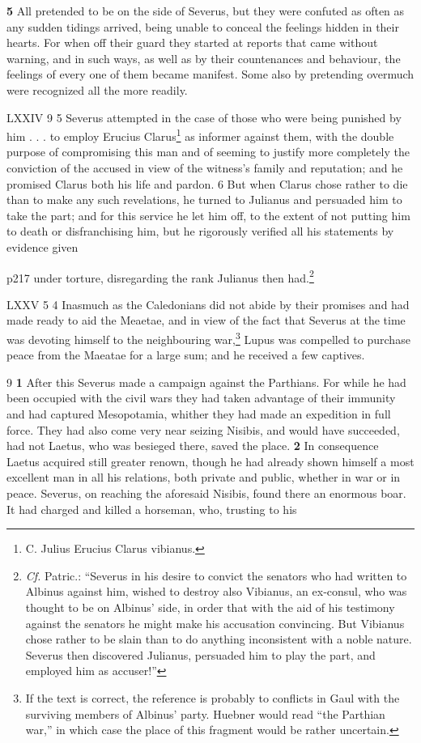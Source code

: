 \textbf{5} All pretended to be on the side of Severus, but they were confuted as often as any sudden tidings arrived, being unable to conceal the feelings hidden in their hearts. For when off their guard they started at reports that came without warning, and in such ways, as well as by their countenances and behaviour, the feelings of every one of them became manifest. Some also by pretending overmuch were recognized all the more readily.

LXXIV
9 5 Severus attempted in the case of those who were being punished by him . . . to employ Erucius Clarus\texthebrew{⁠}\footnote{C. Julius Erucius Clarus vibianus.

} as informer against them, with the double purpose of compromising this man and of seeming to justify more completely the conviction of the accused in view of the witness's family and reputation; and he promised Clarus both his life and pardon. 6 But when Clarus chose rather to die than to make any such revelations, he turned to Julianus and persuaded him to take the part; and for this service he let him off, to the extent of not putting him to death or disfranchising him, but he rigorously verified all his statements by evidence given

p217 under torture, disregarding the rank Julianus then had.\footnote{\emph{Cf.} Patric.: ``Severus in his desire to convict the senators who had written to Albinus against him, wished to destroy also Vibianus, an ex\texthebrew{‑}consul, who was thought to be on Albinus' side, in order that with the aid of his testimony against the senators he might make his accusation convincing. But Vibianus chose rather to be slain than to do anything inconsistent with a noble nature. Severus then discovered Julianus, persuaded him to play the part, and employed him as accuser!''

}

LXXV
5 4 Inasmuch as the Caledonians did not abide by their promises and had made ready to aid the Meaetae, and in view of the fact that Severus at the time was devoting himself to the neighbouring war,\texthebrew{⁠}\footnote{If the text is correct, the reference is probably to conflicts in Gaul with the surviving members of Albinus' party. Huebner would read ``the Parthian war,'' in which case the place of this fragment would be rather uncertain.

} Lupus was compelled to purchase peace from the Maeatae for a large sum; and he received a few captives.

9 \textbf{1} After this Severus made a campaign against the Parthians. For while he had been occupied with the civil wars they had taken advantage of their immunity and had captured Mesopotamia, whither they had made an expedition in full force. They had also come very near seizing Nisibis, and would have succeeded, had not Laetus, who was besieged there, saved the place. \textbf{2} In consequence Laetus acquired still greater renown, though he had already shown himself a most excellent man in all his relations, both private and public, whether in war or in peace. Severus, on reaching the aforesaid Nisibis, found there an enormous boar. It had charged and killed a horseman, who, trusting to his


